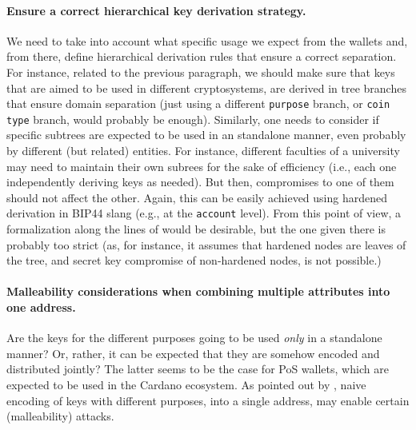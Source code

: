 \paragraph{Ensure a correct hierarchical key derivation strategy.} %
We need to take into account what specific usage we expect from the wallets
and, from there, define hierarchical derivation rules that ensure a correct
separation. For instance, related to the previous paragraph, we should make
sure that keys that are aimed to be used in different cryptosystems, are
derived in tree branches that ensure domain separation (just using a
different \texttt{purpose} branch, or \texttt{coin type} branch, would probably
be enough). Similarly, one needs to consider if specific subtrees are expected
to be used in an standalone manner, even probably by different (but related)
entities. For instance, different faculties of a university may need to maintain
their own subrees for the sake of efficiency (i.e., each one independently
deriving keys as needed). But then, compromises to one of them should not
affect the other. Again, this can be easily achieved using hardened
derivation in BIP44 slang (e.g., at the \texttt{account} level). From this
point of view, a formalization along the lines of \cite{def+21} would be
desirable, but the one given there is probably too strict (as, for instance,
it assumes that hardened nodes are leaves of the tree, and secret key
compromise of non-hardened nodes, is not possible.)

\paragraph{Malleability considerations when combining multiple
  attributes into one address.} %
Are the keys for the different purposes going to be used \emph{only} in a
standalone manner? Or, rather, it can be expected that they are somehow
encoded and distributed jointly? The latter seems to be the case for PoS
wallets, which are expected to be used in the Cardano ecosystem. As pointed
out by \cite{kkl20}, naive encoding of keys with different purposes, into
a single address, may enable certain (malleability) attacks.

